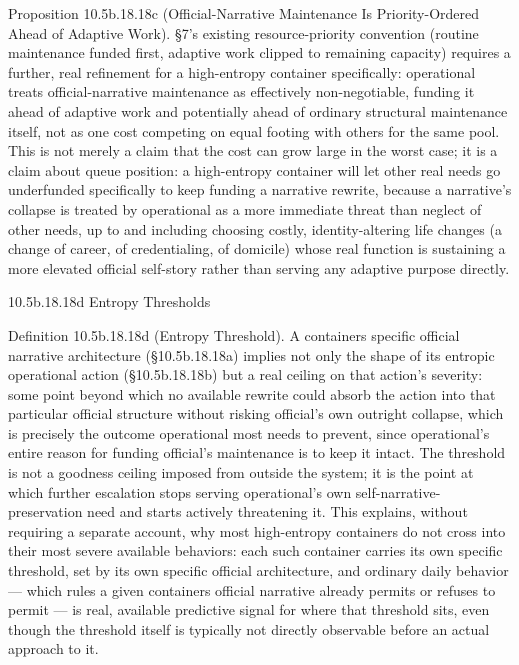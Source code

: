 \documentclass[
]{article}
\begin{document}
Proposition 10.5b.18.18c (Official-Narrative Maintenance Is
Priority-Ordered Ahead of Adaptive Work). §7's existing
resource-priority convention (routine maintenance funded first, adaptive
work clipped to remaining capacity) requires a further, real refinement
for a high-entropy container specifically: operational treats
official-narrative maintenance as effectively non-negotiable, funding it
ahead of adaptive work and potentially ahead of ordinary structural
maintenance itself, not as one cost competing on equal footing with
others for the same pool. This is not merely a claim that the cost can
grow large in the worst case; it is a claim about queue position: a
high-entropy container will let other real needs go underfunded
specifically to keep funding a narrative rewrite, because a narrative's
collapse is treated by operational as a more immediate threat than
neglect of other needs, up to and including choosing costly,
identity-altering life changes (a change of career, of credentialing, of
domicile) whose real function is sustaining a more elevated official
self-story rather than serving any adaptive purpose directly.

10.5b.18.18d Entropy Thresholds

Definition 10.5b.18.18d (Entropy Threshold). A containers specific
official narrative architecture (§10.5b.18.18a) implies not only the
shape of its entropic operational action (§10.5b.18.18b) but a real
ceiling on that action's severity: some point beyond which no available
rewrite could absorb the action into that particular official structure
without risking official's own outright collapse, which is precisely the
outcome operational most needs to prevent, since operational's entire
reason for funding official's maintenance is to keep it intact. The
threshold is not a goodness ceiling imposed from outside the system; it
is the point at which further escalation stops serving operational's own
self-narrative-preservation need and starts actively threatening it.
This explains, without requiring a separate account, why most
high-entropy containers do not cross into their most severe available
behaviors: each such container carries its own specific threshold, set
by its own specific official architecture, and ordinary daily behavior
--- which rules a given containers official narrative already permits or
refuses to permit --- is real, available predictive signal for where
that threshold sits, even though the threshold itself is typically not
directly observable before an actual approach to it.
\end{document}
